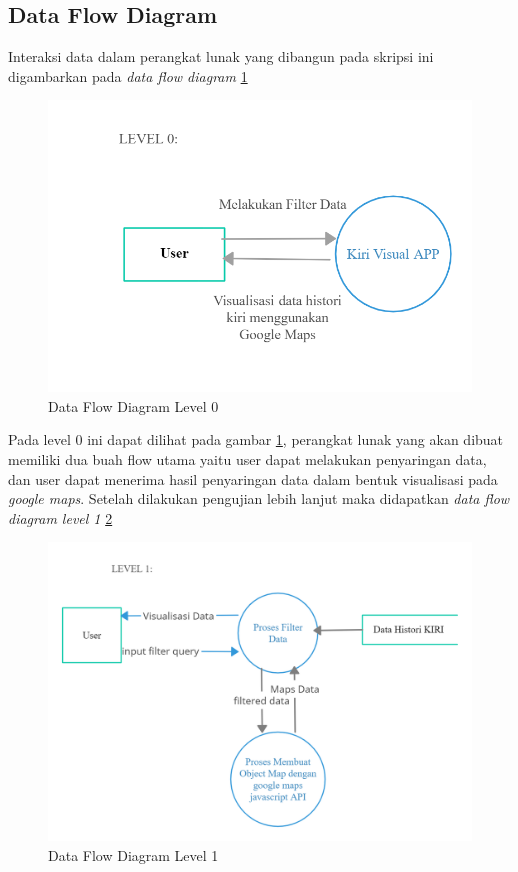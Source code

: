 \subsection{Data Flow Diagram}
Interaksi data dalam perangkat lunak yang dibangun pada skripsi ini digambarkan pada \textit{data flow diagram} \ref{fig:dfd_0}
\begin{figure}[H]
	\centering  
	\includegraphics[scale=0.4]{Gambar/DFD_0.png}  
	\caption[Data Flow Diagram Level 0]{Data Flow Diagram Level 0} 
	\label{fig:dfd_0} 
\end{figure} 

Pada level 0 ini dapat dilihat pada gambar \ref{fig:dfd_0}, perangkat lunak yang akan dibuat memiliki dua buah flow utama yaitu user dapat melakukan penyaringan data, dan user dapat menerima hasil penyaringan data dalam bentuk visualisasi pada \textit{google maps}. Setelah dilakukan pengujian lebih lanjut maka didapatkan \textit{data flow diagram level 1} \ref{fig:dfd_1}

\begin{figure}[H]
	\centering  
	\includegraphics[scale=0.3]{Gambar/DFD_1.png}  
	\caption[Data Flow Diagram Level 1]{Data Flow Diagram Level 1} 
	\label{fig:dfd_1} 
\end{figure} 

